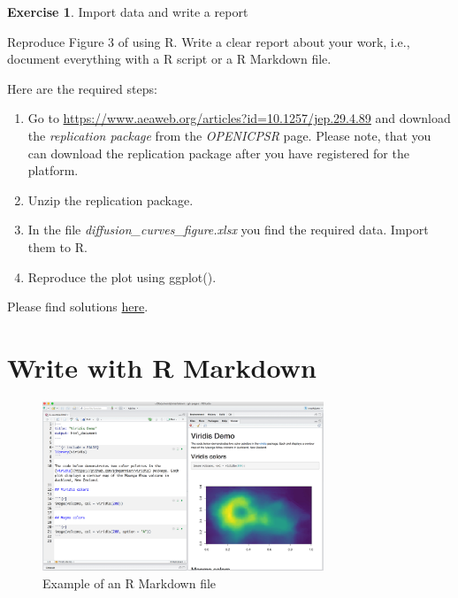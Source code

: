 \documentclass[
  12pt,
  oneside]{book}
\providecommand{\tightlist}{%
  \setlength{\itemsep}{0pt}\setlength{\parskip}{0pt}}
\theoremstyle{definition}
\theoremstyle{definition}
\theoremstyle{definition}
\newtheorem{exercise}{Exercise}[chapter]
\theoremstyle{definition}
\theoremstyle{remark}
\begin{document}
\begin{exercise}
\protect\hypertarget{exr:hortacsu}{}\label{exr:hortacsu}Import data and write a report

Reproduce Figure 3 of \citet[p.~99]{Hortacsu2015Ongoing} using R. Write a clear report about your work, i.e., document everything with a R script or a R Markdown file.

Here are the required steps:

\begin{enumerate}
\def\labelenumi{\arabic{enumi}.}
\tightlist
\item
  Go to \url{https://www.aeaweb.org/articles?id=10.1257/jep.29.4.89} and download the \emph{replication package} from the \emph{OPENICPSR} page. Please note, that you can download the replication package after you have registered for the platform.
\item
  Unzip the replication package.
\item
  In the file \emph{diffusion\_curves\_figure.xlsx} you find the required data. Import them to R.
\item
  Reproduce the plot using ggplot().
\end{enumerate}

Please find solutions \href{https://raw.githubusercontent.com/hubchev/courses/main/scr/hortacsu_figure_3.R}{here}.
\end{exercise}

\hypertarget{write-with-r-markdown}{%
\chapter{Write with R Markdown}\label{write-with-r-markdown}}

\begin{figure}
\centering
\includegraphics[width=0.75\textwidth,height=\textheight]{fig/rmstudio.png}
\caption{\label{fig:examplermd} Example of an R Markdown file}
\end{figure}
\end{document}
